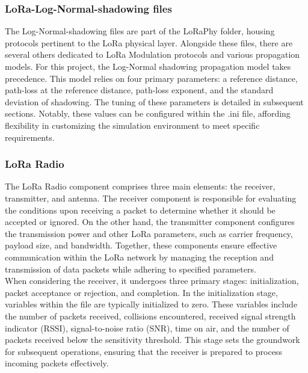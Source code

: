 \subsubsection{LoRa-Log-Normal-shadowing files}
The Log-Normal-shadowing files are part of the LoRaPhy folder, housing protocols pertinent to the LoRa physical layer. Alongside these files, there are several others dedicated to LoRa Modulation protocols and various propagation models. For this project, the Log-Normal shadowing propagation model takes precedence. This model relies on four primary parameters: a reference distance, path-loss at the reference distance, path-loss exponent, and the standard deviation of shadowing. The tuning of these parameters is detailed in subsequent sections. Notably, these values can be configured within the .ini file, affording flexibility in customizing the simulation environment to meet specific requirements.\\

\subsubsection{LoRa Radio}
The LoRa Radio component comprises three main elements: the receiver, transmitter, and antenna. The receiver component is responsible for evaluating the conditions upon receiving a packet to determine whether it should be accepted or ignored. On the other hand, the transmitter component configures the transmission power and other LoRa parameters, such as carrier frequency, payload size, and bandwidth. Together, these components ensure effective communication within the LoRa network by managing the reception and transmission of data packets while adhering to specified parameters.\\ 
When considering the receiver, it undergoes three primary stages: initialization, packet acceptance or rejection, and completion. In the initialization stage, variables within the file are typically initialized to zero. These variables include the number of packets received, collisions encountered, received signal strength indicator (RSSI), signal-to-noise ratio (SNR), time on air, and the number of packets received below the sensitivity threshold. This stage sets the groundwork for subsequent operations, ensuring that the receiver is prepared to process incoming packets effectively.\\


